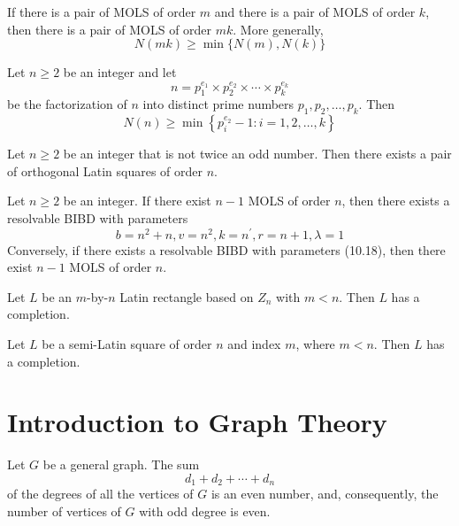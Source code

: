 \begin{theorem}
  \label{thm:10.4.7}
  If there is a pair of MOLS of order $m$ and there is a pair of MOLS of order $k$, then there is a 
  pair of MOLS of order $mk$. More generally,
  \[ N(mk) \geq \min\{N(m), N(k)\} \]
\end{theorem}

\begin{theorem}
  \label{thm:10.4.8}
  Let $n \geq 2$ be an integer and let
  $$
  n=p_1^{e_1} \times p_2^{e_2} \times \cdots \times p_k^{e_k}
  $$
  be the factorization of $n$ into distinct prime numbers $p_1, p_2, \ldots, p_k$. Then
  $$
  N(n) \geq \min \left\{p_i^{e_2}-1: i=1,2, \ldots, k\right\}
  $$
\end{theorem}

\begin{corollary}
  \label{cor:10.4.9}
  Let $n \geq 2$ be an integer that is not twice an odd number. Then there exists a pair of 
  orthogonal Latin squares of order $n$.
\end{corollary}

\begin{theorem}
  \label{thm:10.4.10}
  Let $n \geq 2$ be an integer. If there exist $n-1$ MOLS of order $n$, then there exists a 
  resolvable BIBD with parameters
  \begin{equation}\label{10.18}
    b=n^2+n, v=n^2, k=n^{\prime}, r=n+1, \lambda=1
  \end{equation}
  Conversely, if there exists a resolvable BIBD with parameters (10.18), then there exist $n-1$ 
  MOLS of order $n$.
\end{theorem}

\begin{theorem}
  \label{thm:10.4.11}
  Let $L$ be an $m$-by-$n$ Latin rectangle based on $Z_n$ with $m < n$. Then $L$ has a completion.
\end{theorem}

\begin{theorem}
  \label{thm:10.4.12}
  Let $L$ be a semi-Latin square of order $n$ and index $m$, where $m < n$. Then $L$ has a completion.
\end{theorem}

\chapter{Introduction to Graph Theory}

\begin{theorem}
  \label{thm:11.1.1}
  Let $G$ be a general graph. The sum
  \[ d_1 + d_2 + \cdots + d_n\]
  of the degrees of all the vertices of $G$ is an even number, and, consequently, the number of 
  vertices of $G$ with odd degree is even.
\end{theorem}

